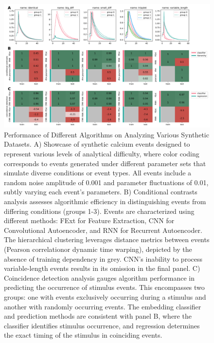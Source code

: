 \begin{figure}[!htb]
\begin{center}
\includegraphics[width=\linewidth]{figures/6.png}
\end{center}
\caption{Performance of Different Algorithms on Analyzing Various Synthetic Datasets. A) Showcase of synthetic calcium events designed to represent various levels of analytical difficulty, where color coding corresponds to events generated under different parameter sets that simulate diverse conditions or event types. All events include a random noise amplitude of 0.001 and parameter fluctuations of 0.01, subtly varying each event's parameters. B) Conditional contrasts analysis assesses algorithmic efficiency in distinguishing events from differing conditions (groups 1-3). Events are characterized using different methods: FExt for Feature Extraction, CNN for Convolutional Autoencoder, and RNN for Recurrent Autoencoder. The hierarchical clustering leverages distance metrics between events (Pearson correlationor dynamic time warping), depicted by the absence of training dependency in grey. CNN's inability to process variable-length events results in its omission in the final panel. C) Coincidence detection analysis gauges algorithm performance in predicting the occurrence of stimulus events. This encompasses two groups: one with events exclusively occurring during a stimulus and another with randomly occurring events. The embedding classifier and prediction methods are consistent with panel B, where the classifier identifies stimulus occurrence, and regression determines the exact timing of the stimulus in coinciding events.}\label{fig:6}
\end{figure}

